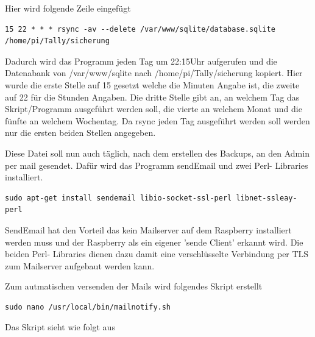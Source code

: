 \documentclass[11pt,a4paper]{article} %
\begin{document}
Hier wird folgende Zeile eingef\"ugt
\begin{frame}

\begin{lstlisting}
15 22 * * * rsync -av --delete /var/www/sqlite/database.sqlite  /home/pi/Tally/sicherung
\end{lstlisting}
\end{frame}
Dadurch wird das Programm jeden Tag um 22:15Uhr aufgerufen und die Datenabank von /var/www/sqlite nach /home/pi/Tally/sicherung  kopiert. Hier wurde die erste Stelle auf 15 gesetzt welche die Minuten Angabe ist, die zweite auf 22 für die Stunden Angaben. Die dritte Stelle gibt an, an welchem Tag das Skript/Programm ausgeführt werden soll, die vierte an welchem Monat und die fünfte an welchem Wochentag. Da rsync jeden Tag ausgeführt werden soll werden nur die ersten beiden Stellen angegeben.
\par
Diese Datei soll nun auch t\"aglich, nach dem erstellen des Backups, an den Admin per mail gesendet.
Daf\"ur wird das Programm sendEmail und zwei Perl- Libraries installiert.
\begin{frame}

\begin{lstlisting}
sudo apt-get install sendemail libio-socket-ssl-perl libnet-ssleay-perl
\end{lstlisting}
\end{frame}
SendEmail hat den Vorteil das kein Mailserver auf dem Raspberry installiert werden muss und der Raspberry als ein eigener 'sende Client' erkannt wird. Die beiden Perl- Libraries dienen dazu damit eine verschl\"usselte Verbindung per TLS zum Mailserver aufgebaut werden kann.
\par
Zum autmatischen versenden der Mails wird folgendes Skript erstellt \cite{berry8}
\begin{frame}

\begin{lstlisting}
sudo nano /usr/local/bin/mailnotify.sh
\end{lstlisting}
\end{frame}
\newpage
Das Skript sieht wie folgt aus
\end{document}
